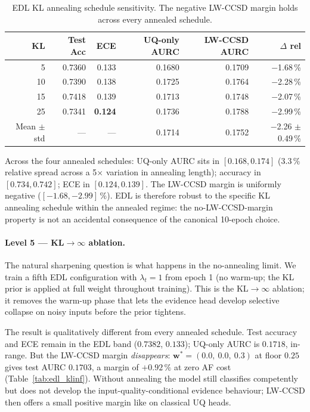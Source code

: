 \documentclass[journal]{IEEEtran}
\begin{document}
\begin{table}[t]
\centering
\caption{EDL KL annealing schedule sensitivity. The negative LW-CCSD margin holds across every annealed schedule.}
\label{tab:edl_kl_sensitivity}
\begin{tabular}{rrrrrr}
\toprule
KL & Test Acc & ECE & UQ-only AURC & LW-CCSD AURC & $\Delta$ rel \\
\midrule
5    & 0.7360 & 0.133          & 0.1680 & 0.1709 & $-$1.68\,\% \\
10   & 0.7390 & 0.138          & 0.1725 & 0.1764 & $-$2.28\,\% \\
15   & 0.7418 & 0.139          & 0.1713 & 0.1748 & $-$2.07\,\% \\
25   & 0.7341 & \textbf{0.124} & 0.1736 & 0.1788 & $-$2.99\,\% \\
\midrule
Mean $\pm$ std & --- & --- & 0.1714 & 0.1752 & $-$2.26 $\pm$ 0.49\,\% \\
\bottomrule
\end{tabular}
\end{table}

Across the four annealed schedules: UQ-only AURC sits in $[0.168, 0.174]$ (3.3\,\% relative spread across a 5$\times$ variation in annealing length); accuracy in $[0.734, 0.742]$; ECE in $[0.124, 0.139]$. The LW-CCSD margin is uniformly negative ($[-1.68, -2.99]\,\%$). EDL is therefore robust to the specific KL annealing schedule within the annealed regime: the no-LW-CCSD-margin property is not an accidental consequence of the canonical 10-epoch choice.

\paragraph{Level 5 --- KL$\to\infty$ ablation.} The natural sharpening question is what happens in the no-annealing limit. We train a fifth EDL configuration with $\lambda_t = 1$ from epoch 1 (no warm-up; the KL prior is applied at full weight throughout training). This is the KL$\to\infty$ ablation; it removes the warm-up phase that lets the evidence head develop selective collapse on noisy inputs before the prior tightens.

The result is qualitatively different from every annealed schedule. Test accuracy and ECE remain in the EDL band ($0.7382$, $0.133$); UQ-only AURC is $0.1718$, in-range. But the LW-CCSD margin \emph{disappears}: $\mathbf{w}^{*} = (0.0,\ 0.0,\ 0.3)$ at floor $0.25$ gives test AURC $0.1703$, a margin of $+0.92\,\%$ at zero AF cost (Table~\ref{tab:edl_klinf}). Without annealing the model still classifies competently but does not develop the input-quality-conditional evidence behaviour; LW-CCSD then offers a small positive margin like on classical UQ heads.
\end{document}
